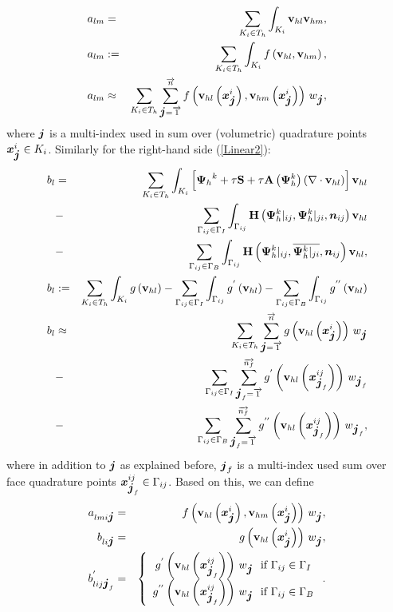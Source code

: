 \begin{eqnarray}
a_{lm} & = & \sum_{K_i \in T_h}\int_{K_i} \mathrm{\mathbf{v}}_{hl} \mathrm{\mathbf{v}}_{hm}, \\
a_{lm} & := & \sum_{K_i \in T_h}\int_{K_i} f\left(\mathrm{\mathbf{v}}_{hl}, \mathrm{\mathbf{v}}_{hm}\right) , \\
a_{lm} & \approx & \sum_{K_i \in T_h} \sum_{\mbox{\boldmath $j$}=\overrightarrow{1}}^{\overrightarrow{n}} f\left(\mathrm{\mathbf{v}}_{hl}\left(\mbox{\boldmath $x$}_{\mbox{\boldmath $j$}}^i\right), \mathrm{\mathbf{v}}_{hm}\left(\mbox{\boldmath $x$}_{\mbox{\boldmath $j$}}^i\right)\right)\,w_{\mbox{\boldmath $j$}},\label{Final_Integration_Fn}
\end{eqnarray}
where $\mbox{\boldmath $j$}$ is a multi-index used in sum over (volumetric) quadrature points $\mbox{\boldmath $x$}_{\mbox{\boldmath $j$}}^i \in K_i$.
Similarly for the right-hand side (\ref{Linear2}):
\begin{eqnarray}
b_{l} & = & \sum_{K_i \in T_h}\int_{K_i} \left[{\mathrm{\mathbf{\Psi}}_h}^{k} + \tau\mathrm{\mathbf{S}} + \tau\mathrm{\mathbf{A}}\left({\mathrm{\mathbf{\Psi}}_h^{k}}\right) \left(\nabla \cdot \mathrm{\mathbf{v}}_{hl}\right)\right] \mathrm{\mathbf{v}}_{hl}\\\nonumber & - &\sum_{\Gamma_{ij}\in\Gamma_I} \int_{\Gamma_{ij}}\mathrm{\mathbf{H}}\left({\mathrm{\mathbf{\Psi}}_h^{k}}|_{ij}, {\mathrm{\mathbf{\Psi}}_h^{k}}|_{ji}, \mbox{\boldmath $n$}_{ij}\right) \mathrm{\mathbf{v}}_{hl}\\\nonumber& - &\sum_{\Gamma_{ij}\in\Gamma_B} \int_{\Gamma_{ij}} \mathrm{\mathbf{H}}\left({\mathrm{\mathbf{\Psi}}_h^{k}}|_{ij}, \overline{{\mathrm{\mathbf{\Psi}}_h^{k}}|_{ji}}, \mbox{\boldmath $n$}_{ij}\right) \mathrm{\mathbf{v}}_{hl},\\
b_{l} & := & \sum_{K_i \in T_h}\int_{K_i} g\left(\mathrm{\mathbf{v}}_{hl}\right) - \sum_{\Gamma_{ij}\in\Gamma_I} \int_{\Gamma_{ij}}g^{'}\left(\mathrm{\mathbf{v}}_{hl}\right) - \sum_{\Gamma_{ij}\in\Gamma_B} \int_{\Gamma_{ij}} g^{''}\left(\mathrm{\mathbf{v}}_{hl}\right) \\
b_{l} & \approx & \sum_{K_i \in T_h} \sum_{\mbox{\boldmath $j$}=\overrightarrow{1}}^{\overrightarrow{n}} g\left(\mathrm{\mathbf{v}}_{hl}\left(\mbox{\boldmath $x$}_{\mbox{\boldmath $j$}}^i\right)\right)\,w_{\mbox{\boldmath $j$}}\\\nonumber & - & \sum_{\Gamma_{ij}\in\Gamma_I} \sum_{\mbox{\boldmath $j$}_f=\overrightarrow{1}}^{\overrightarrow{n_f}} g^{'}\left(\mathrm{\mathbf{v}}_{hl}\left(\mbox{\boldmath $x$}^{ij}_{\mbox{\boldmath $j$}_{f}}\right)\right)\,w_{\mbox{\boldmath $j$}_{f}}\\\nonumber & - & \sum_{\Gamma_{ij}\in\Gamma_B} \sum_{\mbox{\boldmath $j$}_{f}=\overrightarrow{1}}^{\overrightarrow{n_f}} g^{''}\left(\mathrm{\mathbf{v}}_{hl}\left(\mbox{\boldmath $x$}^{ij}_{\mbox{\boldmath $j$}_{f}}\right)\right)\,w_{\mbox{\boldmath $j$}_{f}},
\label{Final_Integration_Fn_b}
\end{eqnarray}
where in addition to $\mbox{\boldmath $j$}$ as explained before, $\mbox{\boldmath $j$}_{f}$ is a multi-index used sum over face quadrature points $\mbox{\boldmath $x$}_{\mbox{\boldmath $j$}_f}^{ij} \in \Gamma_{ij}$. Based on this, we can define
\begin{eqnarray}
\label{singleNumIntA}
a_{lmi \bfj} & = & f\lo\mrvhl\lo\bfx^i_{\bfj}\ro, \mrvhm\lo\bfx^i_{\bfj}\ro\ro\,w_{\bfj},\\
\label{singleNumIntB}
b_{li \bfj} & = & g\lo\mrvhl\lo\bfx^i_{\bfj}\ro\ro\,w_{\bfj},\\
\label{singleNumIntBface}
b^{'}_{lij \bfj_f} & = & \left\{\begin{array}{c} g^{'}\lo\mrvhl\lo\bfx^{ij}_{\bfj_f}\ro\ro\,w_{\bfj}\ \ \text{if}\ \Gamma_{ij}\in \Gamma_I \\ g^{''}\lo\mrvhl\lo\bfx^{ij}_{\bfj_f}\ro\ro\,w_{\bfj}\ \ \text{if}\ \Gamma_{ij}\in \Gamma_B \end{array}\right. .
\end{eqnarray}

